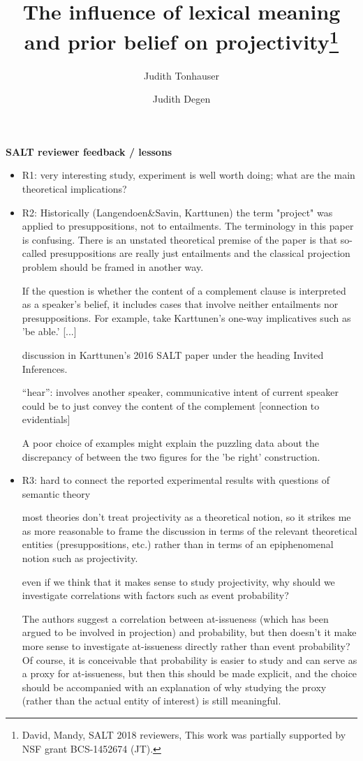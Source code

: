 \documentclass[11pt,fleqn]{article}
\title{The influence of lexical meaning and prior belief on projectivity\thanks{David, Mandy, SALT 2018 reviewers, This work was partially supported by NSF grant BCS-1452674 (JT).}}
\author[$\bullet$]{Judith Tonhauser}
\author[$\triangleright$]{Judith Degen}
\affil[$\bullet$]{The Ohio State University}
\affil[$\triangleright$]{Stanford University}
\newcommand{\6}{\mbox{$[\hspace*{-.6mm}[$}}
\newcommand{\9}{\mbox{$]\hspace*{-.6mm}]$}}
\begin{document}
\maketitle


{\bf SALT reviewer feedback / lessons}

\begin{itemize}

\item R1: very interesting study, experiment is well worth doing; what are the main theoretical implications?

\item R2: Historically (Langendoen\&Savin, Karttunen) the term "project" was applied to presuppositions, not to entailments. The terminology in this paper is confusing. There is an unstated theoretical premise of the paper is that so-called presuppositions are really just entailments and the classical projection problem should be framed in another way.

If the question is whether the content of a complement clause is interpreted as a speaker's belief, it includes cases that involve neither entailments nor presuppositions. For example, take Karttunen's one-way implicatives such as 'be able.'  [...]

discussion in Karttunen’s 2016 SALT paper under the heading Invited Inferences.

``hear'': involves another speaker, communicative intent of current speaker could be to just convey the content of the complement [connection to evidentials]

A poor choice of examples might explain the puzzling data about the discrepancy of between the two figures for the 'be right' construction. 

\item R3: hard to connect the reported experimental results with questions of semantic theory

most theories don't treat projectivity as a theoretical notion, so it strikes me as more reasonable to frame the discussion in terms of the relevant theoretical entities (presuppositions, etc.) rather than in terms of an epiphenomenal notion such as projectivity.

even if we think that it makes sense to study projectivity, why should we investigate correlations with factors such as event probability?

The authors suggest a correlation between at-issueness (which has been argued to be involved in projection) and probability, but then doesn't it make more sense to investigate at-issueness directly rather than event probability? Of course, it is conceivable that probability is easier to study and can serve as a proxy for at-issueness, but then this should be made explicit, and the choice should be accompanied with an explanation of why studying the proxy (rather than the actual entity of interest) is still meaningful.


\end{itemize}
\end{document}
